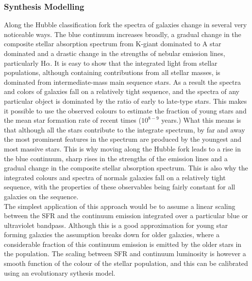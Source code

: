 \documentclass{literature}
\begin{document}
\subsubsection{Synthesis Modelling}
Along the Hubble classification fork the spectra of galaxies change in several very noticeable ways. The blue continuum increases broadly, a gradual change in the composite stellar absorption spectrum from K-giant dominated to A star dominated and a drastic change in the strengths of nebular emission lines, particularly H$\alpha$. It is easy to show that the integrated light from stellar populations, although containing contributions from all stellar masses, is dominated from intermediate-mass main sequence stars. As a result the spectra and colors of galaxies fall on a relatively tight sequence, and the spectra of any particular object is dominated by the ratio of early to late-type stars. This makes it possible to use the observed colours to estimate the fraction of young stars and the mean star formation rate of recent times ($10^{8-9}$ years.) What this means is that although all the stars contribute to the integrate spectrum, by far and away the most prominent features in the spectrum are produced by the youngest and most massive stars. This is why moving along the Hubble fork leads to a rise in the blue continuum, sharp rises in the strengths of the emission lines and a gradual change in the composite stellar absorption spectrum. This is also why the integrated colours and spectra of normals galaxies fall on a relatively tight sequence, with the properties of these observables being fairly constant for all galaxies on the sequence. \\
The simplest application of this approach would be to assume a linear scaling between the SFR and the continuum emission integrated over a particular blue or ultraviolet bandpass. Although this is a good approximation for young star forming galaxies the assumption breaks down for older galaxies, where a considerable fraction of this continuum emission is emitted by the older stars in the population. The scaling between SFR and continuum luminosity is however a smooth function of the colour of the stellar population, and this can be calibrated using an evolutionary sythesis model. \\
\end{document}
